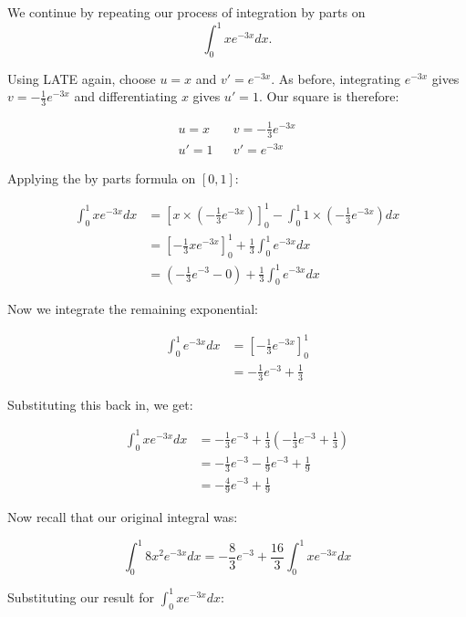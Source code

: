 \begin{solution}
    We continue by repeating our process of integration by parts on
    \[
        \int_0^1 x e^{-3x} dx.
    \]

    Using LATE again, choose $u = x$ and $v' = e^{-3x}$. As before, integrating $e^{-3x}$ gives $v = -\frac{1}{3}e^{-3x}$ and differentiating $x$ gives $u' = 1$.
    Our square is therefore:

    \begin{align*}
        u = x & & v = -\frac{1}{3}e^{-3x} \\
        u' = 1 & & v' = e^{-3x}
    \end{align*}

    Applying the by parts formula on $[0,1]$:

    \begin{align*}
        \int_0^1 x e^{-3x} dx &= \left[x \times \left(-\frac{1}{3}e^{-3x}\right)\right]_0^1 - \int_0^1 1 \times \left(-\frac{1}{3}e^{-3x}\right) dx \\
        &= \left[-\frac{1}{3}x e^{-3x}\right]_0^1 + \frac{1}{3}\int_0^1 e^{-3x} dx \\
        &= \left(-\frac{1}{3}e^{-3} - 0\right) + \frac{1}{3}\int_0^1 e^{-3x} dx \tag{evaluating the boundary term}
    \end{align*}

    Now we integrate the remaining exponential:

    \begin{align*}
        \int_0^1 e^{-3x} dx &= \left[-\frac{1}{3}e^{-3x}\right]_0^1 \\
        &= -\frac{1}{3}e^{-3} + \frac{1}{3}
    \end{align*}

    Substituting this back in, we get:

    \begin{align*}
        \int_0^1 x e^{-3x} dx &= -\frac{1}{3}e^{-3} + \frac{1}{3}\left(-\frac{1}{3}e^{-3} + \frac{1}{3}\right) \\
        &= -\frac{1}{3}e^{-3} - \frac{1}{9}e^{-3} + \frac{1}{9} \\
        &= -\frac{4}{9}e^{-3} + \frac{1}{9}
    \end{align*}

    Now recall that our original integral was:

    \[
        \int_0^{1} 8 x^2 e^{-3x} dx = -\frac{8}{3}e^{-3} + \frac{16}{3}\int_0^{1} x  e^{-3x} dx
    \]

    Substituting our result for $\int_0^1 x e^{-3x} dx$:


\end{solution}
